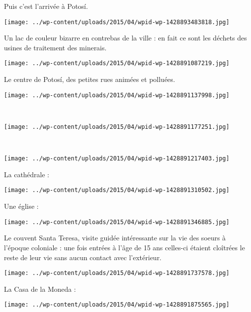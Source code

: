  Puis c'est l'arrivée à Potosí.
\begin{center} \texttt{[image: ../wp-content/uploads/2015/04/wpid-wp-1428893483818.jpg]} \end{center}
\vspace{-\topsep}

\pagebreak
 Un lac de couleur bizarre en contrebas de la ville : en fait ce sont les déchets des usines de traitement des minerais.
\begin{center} \texttt{[image: ../wp-content/uploads/2015/04/wpid-wp-1428891087219.jpg]} \end{center}

 Le centre de Potosí, des petites rues animées et polluées. 
\begin{center} \texttt{[image: ../wp-content/uploads/2015/04/wpid-wp-1428891137998.jpg]} \end{center}
\vspace{-\topsep}

\pagebreak
~\\
\begin{center} \texttt{[image: ../wp-content/uploads/2015/04/wpid-wp-1428891177251.jpg]} \end{center}
~
\begin{center} \texttt{[image: ../wp-content/uploads/2015/04/wpid-wp-1428891217403.jpg]} \end{center}
\vspace{-\topsep}

\pagebreak
  La cathédrale :
\begin{center} \texttt{[image: ../wp-content/uploads/2015/04/wpid-wp-1428891310502.jpg]} \end{center}

  Une église :
\begin{center} \texttt{[image: ../wp-content/uploads/2015/04/wpid-wp-1428891346885.jpg]} \end{center}

 Le couvent Santa Teresa, visite guidée intéressante sur la vie des soeurs à l'époque coloniale : une fois entrées à l'âge de 15 ans celles-ci étaient cloîtrées le reste de leur vie sans aucun contact avec l'extérieur. 
\begin{center} \texttt{[image: ../wp-content/uploads/2015/04/wpid-wp-1428891737578.jpg]} \end{center}

 La Casa de la Moneda :
\begin{center} \texttt{[image: ../wp-content/uploads/2015/04/wpid-wp-1428891875565.jpg]} \end{center}

